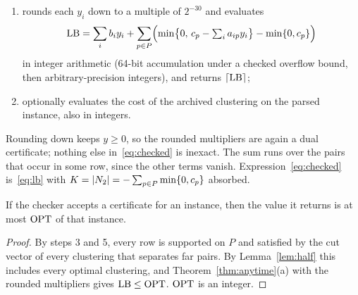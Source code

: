 \begin{enumerate}
of $R$ inside $K$, the left-hand side is at least $|T|-|R|-(|K|-e_R(K))$.  In
the first case $K$ is a clique of $R$ and $|K|-\binom{|K|}2\le1$; in the
second, $|K|-e_R(K)$ is at most the number of connected components of
$(K,R)$, since a component with $s$ vertices has at least $s-1$ edges, and
hence at most the independence number of $(T,R)$.)
\item rounds each $y_i$ down to a multiple of $2^{-30}$ and evaluates
\begin{equation}\label{eq:checked}
\mathrm{LB}=\sum_i b_iy_i+\sum_{p\in P}\Bigl(\min\bigl\{0,\,c_p-\textstyle\sum_i a_{ip}y_i\bigr\}-\min\{0,c_p\}\Bigr)
\end{equation}
in integer arithmetic (64-bit accumulation under a checked overflow bound,
then arbitrary-precision integers), and returns $\lceil\mathrm{LB}\rceil$;
\item optionally evaluates the cost of the archived clustering on the parsed
instance, also in integers.
\end{enumerate}
Rounding down keeps $y\ge0$, so the rounded multipliers are again a dual
certificate; nothing else in~\eqref{eq:checked} is inexact.  The sum runs
over the pairs that occur in some row, since the other terms vanish.
Expression~\eqref{eq:checked} is~\eqref{eq:lb} with $K=|N_{2}|=
-\sum_{p\in P}\min\{0,c_p\}$ absorbed.

\begin{proposition}\label{prop:checker}
If the checker accepts a certificate for an instance, then the value it
returns is at most $\mathrm{OPT}$ of that instance.
\end{proposition}
\begin{proof}
By steps 3 and 5, every row is supported on $P$ and satisfied by the cut
vector of every clustering that separates far pairs.  By
Lemma~\ref{lem:half} this includes every optimal clustering, and
Theorem~\ref{thm:anytime}(a) with the rounded multipliers gives $\mathrm{LB}\le\mathrm{OPT}$.
$\mathrm{OPT}$ is an integer.
\end{proof}

